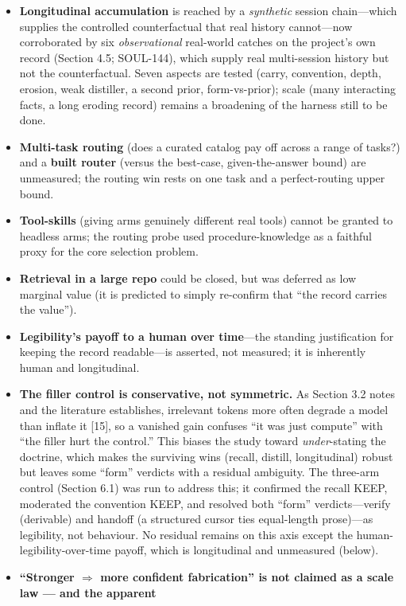 \documentclass[11pt]{article}
\begin{document}
\begin{itemize}
\item \textbf{Longitudinal accumulation} is reached by a \emph{synthetic} session chain---which
  supplies the controlled counterfactual that real history cannot---now corroborated by six
  \emph{observational} real-world catches on the project's own record (Section 4.5; SOUL-144),
  which supply real multi-session history but not the counterfactual. Seven aspects are
  tested (carry, convention, depth, erosion, weak distiller, a second prior, form-vs-prior);
  scale (many interacting facts, a long eroding record) remains a broadening of the harness
  still to be done.
\item \textbf{Multi-task routing} (does a curated catalog pay off across a range of tasks?) and
  a \textbf{built router} (versus the best-case, given-the-answer bound) are unmeasured; the
  routing win rests on one task and a perfect-routing upper bound.
\item \textbf{Tool-skills} (giving arms genuinely different real tools) cannot be granted to
  headless arms; the routing probe used procedure-knowledge as a faithful proxy for the core
  selection problem.
\item \textbf{Retrieval in a large repo} could be closed, but was deferred as low marginal
  value (it is predicted to simply re-confirm that ``the record carries the value'').
\item \textbf{Legibility's payoff to a human over time}---the standing justification for keeping
  the record readable---is asserted, not measured; it is inherently human and longitudinal.
\item \textbf{The filler control is conservative, not symmetric.} As Section 3.2 notes and the
  literature establishes, irrelevant tokens more often degrade a model than inflate it [15],
  so a vanished gain confuses ``it was just compute'' with ``the filler hurt the control.''
  This biases the study toward \emph{under}-stating the doctrine, which makes the surviving
  wins (recall, distill, longitudinal) robust but leaves some ``form'' verdicts with a
  residual ambiguity. The three-arm control (Section 6.1) was run to address this; it
  confirmed the recall KEEP, moderated the convention KEEP, and resolved both ``form''
  verdicts---verify (derivable) and handoff (a structured cursor ties equal-length
  prose)---as legibility, not behaviour. No residual remains on this axis except the
  human-legibility-over-time payoff, which is longitudinal and unmeasured (below).
\item \textbf{``Stronger $\Rightarrow$ more confident fabrication'' is not claimed as a scale law --- and the apparent
}
\end{itemize}
\end{document}
